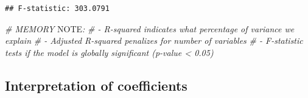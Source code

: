 \documentclass[
]{article}
\newenvironment{Shaded}{\begin{snugshade}}{\end{snugshade}}
\newcommand{\AlertTok}[1]{\textcolor[rgb]{0.94,0.16,0.16}{#1}}
\newcommand{\CommentTok}[1]{\textcolor[rgb]{0.56,0.35,0.01}{\textit{#1}}}
\newcommand{\ConstantTok}[1]{\textcolor[rgb]{0.56,0.35,0.01}{#1}}
\newcommand{\DecValTok}[1]{\textcolor[rgb]{0.00,0.00,0.81}{#1}}
\newcommand{\FunctionTok}[1]{\textcolor[rgb]{0.13,0.29,0.53}{\textbf{#1}}}
\newcommand{\NormalTok}[1]{#1}
\newcommand{\OtherTok}[1]{\textcolor[rgb]{0.56,0.35,0.01}{#1}}
\newcommand{\SpecialCharTok}[1]{\textcolor[rgb]{0.81,0.36,0.00}{\textbf{#1}}}
\newcommand{\StringTok}[1]{\textcolor[rgb]{0.31,0.60,0.02}{#1}}
\begin{document}
\begin{verbatim}
## F-statistic: 303.0791
\end{verbatim}

\begin{Shaded}
\begin{Highlighting}[]
\CommentTok{\# MEMORY }\AlertTok{NOTE}\CommentTok{:}
\CommentTok{\# {-} R{-}squared indicates what percentage of variance we explain}
\CommentTok{\# {-} Adjusted R{-}squared penalizes for number of variables}
\CommentTok{\# {-} F{-}statistic tests if the model is globally significant (p{-}value \textless{} 0.05)}
\end{Highlighting}
\end{Shaded}

\subsection{Interpretation of
coefficients}\label{interpretation-of-coefficients}

\begin{Shaded}
\end{Shaded}
\end{document}

